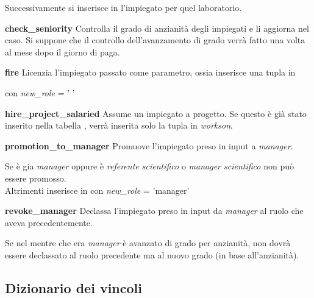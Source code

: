 Successivamente si inserisce in \textit{\worksat} l'impiegato per quel laboratorio.
\bigskip

\newpage
\noindent \textbf{check\_seniority}\sskip
Controlla il grado di anzianità degli impiegati e li aggiorna nel caso. Si suppone che il controllo dell'avanzamento di grado verrà fatto una volta al mese dopo il giorno di paga.
\bigskip

\noindent \textbf{fire}\sskip
Licenzia l'impiegato passato come parametro, ossia inserisce una tupla in

\textit{\careerlog} con \textit{new\_role} = ' '
\bigskip

\noindent \textbf{hire\_project\_salaried}\sskip
Assume un impiegato a progetto. Se questo è già stato inserito nella tabella \textit{\projectsalaried}, verrà inserita solo la tupla in \textit{workson}.
\bigskip

\newpage
\noindent \textbf{promotion\_to\_manager}\sskip
Promuove l'impiegato preso in input a \textit{manager}.

Se è gia \textit{manager} oppure è \textit{referente scientifico} o \textit{manager scientifico} non può essere promosso. \\
Altrimenti inserisce in \textit{\careerlog} con \textit{new\_role} = 'manager'
\bigskip

\newpage
\noindent \textbf{revoke\_manager}\sskip
Declassa l'impiegato preso in input da \textit{manager} al ruolo che aveva precedentemente.

Se nel mentre che era \textit{manager} è avanzato di grado per anzianità, non dovrà essere declassato al ruolo precedente ma al nuovo grado (in base all'anzianità).


\subsection{Dizionario dei vincoli}
